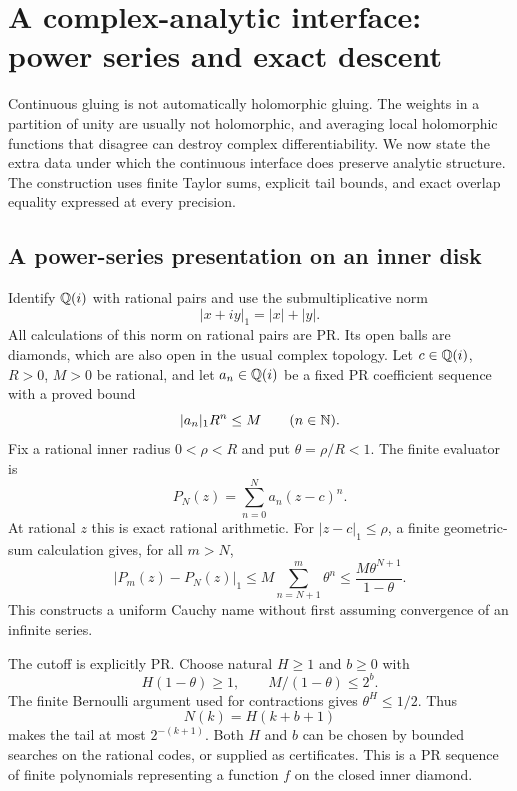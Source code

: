 \section{A complex-analytic interface: power series and exact descent}\label{sec:complex}

Continuous gluing is not automatically holomorphic gluing. The weights in a partition of unity are usually not holomorphic, and averaging local holomorphic functions that disagree can destroy complex differentiability. We now state the extra data under which the continuous interface does preserve analytic structure. The construction uses finite Taylor sums, explicit tail bounds, and exact overlap equality expressed at every precision.

\subsection{A power-series presentation on an inner disk}

Identify \(\mathbb Q(i)\) with rational pairs and use the submultiplicative norm
\[
 |x+iy|_1=|x|+|y|.
\]
All calculations of this norm on rational pairs are PR. Its open balls are diamonds, which are also open in the usual complex topology. Let \(c\in\mathbb Q(i)\), \(R>0\), \(M>0\) be rational, and let \(a_n\in\mathbb Q(i)\) be a fixed PR coefficient sequence with a proved bound
\begin{equation}
 |a_n|_1R^n\leq M\qquad(n\in\mathbb N).
 \label{eq:complex-coeff}
\end{equation}
Fix a rational inner radius \(0<\rho<R\) and put \(\theta=\rho/R<1\). The finite evaluator is
\[
 P_N(z)=\sum_{n=0}^N a_n(z-c)^n.
\]
At rational \(z\) this is exact rational arithmetic. For \(|z-c|_1\leq\rho\), a finite geometric-sum calculation gives, for all \(m>N\),
\begin{equation}
 |P_m(z)-P_N(z)|_1
 \leq M\sum_{n=N+1}^{m}\theta^n
 \leq \frac{M\theta^{N+1}}{1-\theta}.
 \label{eq:complex-tail}
\end{equation}
This constructs a uniform Cauchy name without first assuming convergence of an infinite series.

The cutoff is explicitly PR. Choose natural \(H\geq1\) and \(b\geq0\) with
\[
 H(1-\theta)\geq1,\qquad M/(1-\theta)\leq2^b.
\]
The finite Bernoulli argument used for contractions gives \(\theta^H\leq1/2\). Thus
\[
  N(k)=H(k+b+1)
\]
makes the tail at most \(2^{-(k+1)}\). Both \(H\) and \(b\) can be chosen by bounded searches on the rational codes, or supplied as certificates. This is a PR sequence of finite polynomials representing a function \(f\) on the closed inner diamond.

